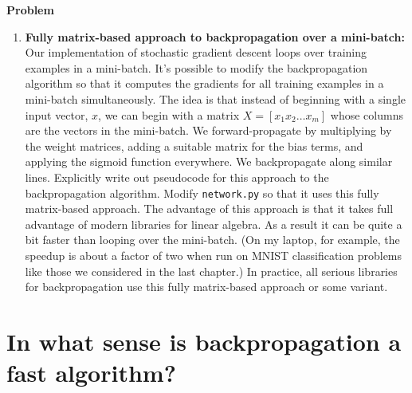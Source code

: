 \textbf{Problem}
\begin{enumerate}
\item \label{page:matrixbackpropagation}
\textbf{Fully matrix-based approach to backpropagation over a mini-batch:} Our implementation of stochastic gradient descent loops over training examples in a mini-batch. It's possible to modify the backpropagation algorithm so that it computes the gradients for all training examples in a mini-batch simultaneously. The idea is that instead of beginning with a single input vector, $x$, we can begin with a matrix $X=\left[x_{1} x_{2} \ldots x_{m}\right]$ whose columns are the vectors in the mini-batch. We forward-propagate by multiplying by the weight matrices, adding a suitable matrix for the bias terms, and applying the sigmoid function everywhere. We backpropagate along similar lines. Explicitly write out pseudocode for this approach to the backpropagation algorithm. Modify \lstinline{network.py} so that it uses this fully matrix-based approach. The advantage of this approach is that it takes full advantage of modern libraries for linear algebra. As a result it can be quite a bit faster than looping over the mini-batch. (On my laptop, for example, the speedup is about a factor of two when run on MNIST classification problems like those we considered in the last chapter.) In practice, all serious libraries for backpropagation use this fully matrix-based approach or some variant. 
\end{enumerate}

\section{In what sense is backpropagation a fast algorithm?}

